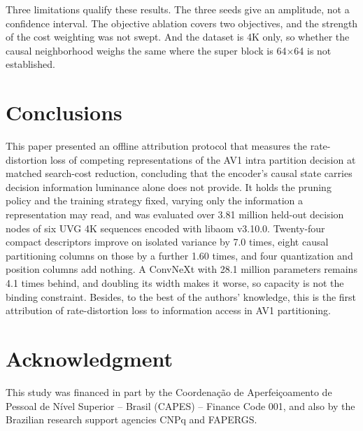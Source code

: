\documentclass[conference]{IEEEtran}
\begin{document}
Three limitations qualify these results. The three seeds give an amplitude, not
a confidence interval. The objective ablation covers two objectives, and the
strength of the cost weighting was not swept. And the dataset is 4K only, so
whether the causal neighborhood weighs the same where the super block is
64$\times$64 is not established.

\section{Conclusions}

This paper presented an offline attribution protocol that measures the
rate-distortion loss of competing representations of the AV1 intra partition
decision at matched search-cost reduction, concluding that the encoder's causal
state carries decision information luminance alone does not provide. It holds
the pruning policy and the training strategy fixed, varying only the information
a representation may read, and was evaluated over 3.81 million held-out decision
nodes of six UVG 4K sequences encoded with libaom v3.10.0. Twenty-four compact
descriptors improve on isolated variance by 7.0 times, eight causal partitioning
columns on those by a further 1.60 times, and four quantization and position
columns add nothing. A ConvNeXt with 28.1 million parameters remains 4.1 times
behind, and doubling its width makes it worse, so capacity is not the binding
constraint. Besides, to the best of the authors' knowledge, this is the first
attribution of rate-distortion loss to information access in AV1 partitioning.

\section*{Acknowledgment}

This study was financed in part by the Coordena\c{c}\~ao de Aperfei\c{c}oamento de
Pessoal de N\'ivel Superior -- Brasil (CAPES) -- Finance Code 001, and also by the
Brazilian research support agencies CNPq and FAPERGS.
\end{document}
